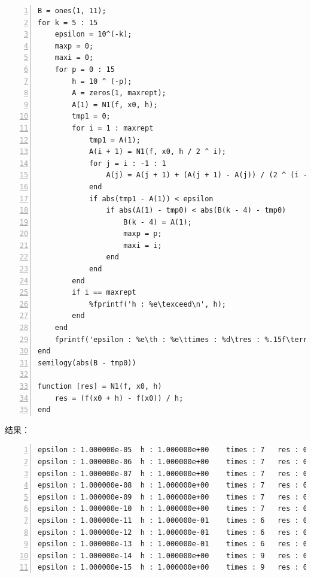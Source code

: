 \documentclass[12pt,a4paper,UTF8]{ctexart}
\begin{document}
\begin{enumerate}
\begin{lstlisting}[frame=single,numbers=left]
B = ones(1, 11);
for k = 5 : 15
    epsilon = 10^(-k);
    maxp = 0;
    maxi = 0;
    for p = 0 : 15
        h = 10 ^ (-p);
        A = zeros(1, maxrept);
        A(1) = N1(f, x0, h);
        tmp1 = 0;
        for i = 1 : maxrept
            tmp1 = A(1);
            A(i + 1) = N1(f, x0, h / 2 ^ i);
            for j = i : -1 : 1
                A(j) = A(j + 1) + (A(j + 1) - A(j)) / (2 ^ (i - j + 1) - 1);
            end
            if abs(tmp1 - A(1)) < epsilon
                if abs(A(1) - tmp0) < abs(B(k - 4) - tmp0)
                    B(k - 4) = A(1);
                    maxp = p;
                    maxi = i;
                end
            end
        end
        if i == maxrept
            %fprintf('h : %e\texceed\n', h);
        end
    end
    fprintf('epsilon : %e\th : %e\ttimes : %d\tres : %.15f\terror : %e\n', 10^(-k), 10^(-maxp), maxi, B(k - 4), abs(B(k - 4) - tmp0));
end
semilogy(abs(B - tmp0))

function [res] = N1(f, x0, h)
    res = (f(x0 + h) - f(x0)) / h;
end
\end{lstlisting}

	结果：\\
\begin{lstlisting}[frame=single,numbers=left]
epsilon : 1.000000e-05	h : 1.000000e+00	times : 7	res : 0.362357754476673	error : 3.885781e-16
epsilon : 1.000000e-06	h : 1.000000e+00	times : 7	res : 0.362357754476673	error : 3.885781e-16
epsilon : 1.000000e-07	h : 1.000000e+00	times : 7	res : 0.362357754476673	error : 3.885781e-16
epsilon : 1.000000e-08	h : 1.000000e+00	times : 7	res : 0.362357754476673	error : 3.885781e-16
epsilon : 1.000000e-09	h : 1.000000e+00	times : 7	res : 0.362357754476673	error : 3.885781e-16
epsilon : 1.000000e-10	h : 1.000000e+00	times : 7	res : 0.362357754476673	error : 3.885781e-16
epsilon : 1.000000e-11	h : 1.000000e-01	times : 6	res : 0.362357754476665	error : 8.437695e-15
epsilon : 1.000000e-12	h : 1.000000e-01	times : 6	res : 0.362357754476665	error : 8.437695e-15
epsilon : 1.000000e-13	h : 1.000000e-01	times : 6	res : 0.362357754476665	error : 8.437695e-15
epsilon : 1.000000e-14	h : 1.000000e+00	times : 9	res : 0.362357754476749	error : 7.527312e-14
epsilon : 1.000000e-15	h : 1.000000e+00	times : 9	res : 0.362357754476749	error : 7.527312e-14
\end{lstlisting}


\end{enumerate}
\end{document}
